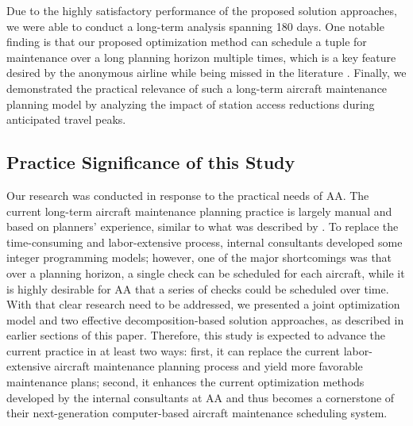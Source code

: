Due to the highly satisfactory performance of the proposed solution approaches, we were able to conduct a long-term analysis spanning 180 days. One notable finding is that our proposed optimization method can schedule a tuple for maintenance over a long planning horizon multiple times, which is a key feature desired by the anonymous airline while being missed in the literature \citep{yan2008long}. Finally, we demonstrated the practical relevance of such a long-term aircraft maintenance planning model by analyzing the impact of station access reductions during anticipated travel peaks.


\subsection{Practice Significance of this Study}
Our research was conducted in response to the practical needs of AA. The current long-term aircraft maintenance planning practice is largely manual and based on planners’ experience, similar to what was described by \cite{boere1977air}. To replace the time-consuming and labor-extensive process, internal consultants developed some integer programming models; however, one of the major shortcomings was that over a planning horizon, a single check can be scheduled for each aircraft, while it is highly desirable for AA that a series of checks could be scheduled over time. With that clear research need to be addressed, we presented a joint optimization model and two effective decomposition-based solution approaches, as described in earlier sections of this paper. Therefore, this study is expected to advance the current practice in at least two ways: first, it can replace the current labor-extensive aircraft maintenance planning process and yield more favorable maintenance plans; second, it enhances the current optimization methods developed by the internal consultants at AA and thus becomes a cornerstone of their next-generation computer-based aircraft maintenance scheduling system.



